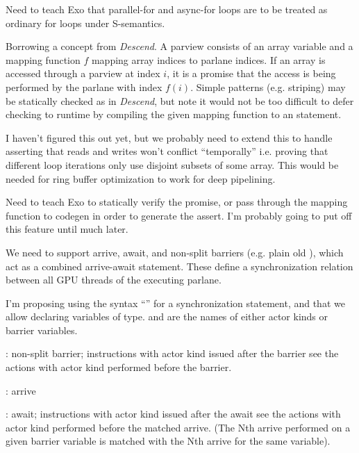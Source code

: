 Need to teach Exo that parallel-for and async-for loops are to be treated as ordinary for loops under S-semantics.

\filbreak
{} Borrowing a concept from \textit{Descend}.
A parview consists of an array variable and a mapping function $f$ mapping array indices to parlane indices.
If an array is accessed through a parview at index $i$, it is a promise that the access is being performed by the parlane with index $f(i)$.
Simple patterns (e.g. striping) may be statically checked as in \textit{Descend}, but note it would not be too difficult to defer checking to runtime by compiling the given mapping function to an  statement.

I haven't figured this out yet, but we probably need to extend this to handle asserting that reads and writes won't conflict ``temporally'' i.e. proving that different loop iterations only use disjoint subsets of some array.
This would be needed for ring buffer optimization to work for deep pipelining.

 Need to teach Exo to statically verify the promise, or pass through the mapping function to codegen in order to generate the assert.
I'm probably going to put off this feature until much later.

\filbreak
{} We need to support arrive, await, and non-split barriers (e.g. plain old ), which act as a combined arrive-await statement.
These define a synchronization relation between all GPU threads of the executing parlane.

I'm proposing using the syntax ``'' for a synchronization statement, and that we allow declaring variables of  type.  and  are the names of either actor kinds or barrier variables.

: non-split barrier; instructions with actor kind  issued after the barrier see the actions with actor kind  performed before the barrier.

: arrive

: await; instructions with actor kind  issued after the await see the actions with actor kind  performed before the matched arrive.
(The Nth arrive performed on a given barrier variable is matched with the Nth arrive for the same variable).

